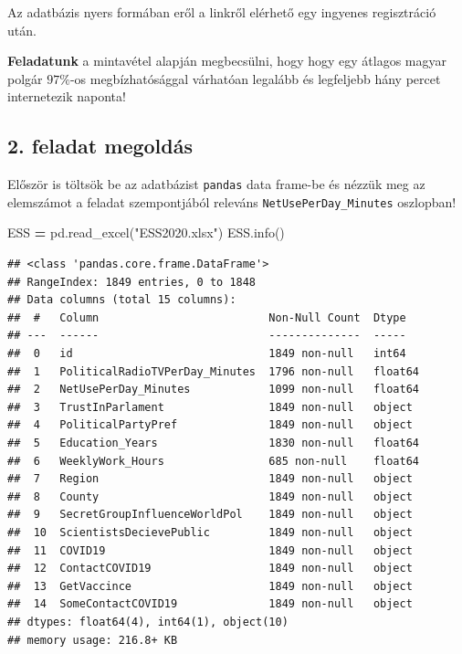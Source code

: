 \documentclass[
]{book}
\newenvironment{Shaded}{\begin{snugshade}}{\end{snugshade}}
\newcommand{\NormalTok}[1]{#1}
\newcommand{\OperatorTok}[1]{\textcolor[rgb]{0.81,0.36,0.00}{\textbf{#1}}}
\newcommand{\StringTok}[1]{\textcolor[rgb]{0.31,0.60,0.02}{#1}}
\begin{document}
Az adatbázis nyers formában eről a linkről elérhető egy ingyenes regisztráció után.

\textbf{Feladatunk} a mintavétel alapján megbecsülni, hogy hogy egy átlagos magyar polgár \(97\%\)-os megbízhatósággal várhatóan legalább és legfeljebb hány percet internetezik naponta!

\subsection*{2. feladat megoldás}\label{feladat-megolduxe1s}

Először is töltsök be az adatbázist \texttt{pandas} data frame-be és nézzük meg az elemszámot a feladat szempontjából releváns \texttt{NetUsePerDay\_Minutes} oszlopban!

\begin{Shaded}
\begin{Highlighting}[]
\NormalTok{ESS }\OperatorTok{=}\NormalTok{ pd.read\_excel(}\StringTok{"ESS2020.xlsx"}\NormalTok{)}
\NormalTok{ESS.info()}
\end{Highlighting}
\end{Shaded}

\begin{verbatim}
## <class 'pandas.core.frame.DataFrame'>
## RangeIndex: 1849 entries, 0 to 1848
## Data columns (total 15 columns):
##  #   Column                          Non-Null Count  Dtype  
## ---  ------                          --------------  -----  
##  0   id                              1849 non-null   int64  
##  1   PoliticalRadioTVPerDay_Minutes  1796 non-null   float64
##  2   NetUsePerDay_Minutes            1099 non-null   float64
##  3   TrustInParlament                1849 non-null   object 
##  4   PoliticalPartyPref              1849 non-null   object 
##  5   Education_Years                 1830 non-null   float64
##  6   WeeklyWork_Hours                685 non-null    float64
##  7   Region                          1849 non-null   object 
##  8   County                          1849 non-null   object 
##  9   SecretGroupInfluenceWorldPol    1849 non-null   object 
##  10  ScientistsDecievePublic         1849 non-null   object 
##  11  COVID19                         1849 non-null   object 
##  12  ContactCOVID19                  1849 non-null   object 
##  13  GetVaccince                     1849 non-null   object 
##  14  SomeContactCOVID19              1849 non-null   object 
## dtypes: float64(4), int64(1), object(10)
## memory usage: 216.8+ KB
\end{verbatim}
\end{document}
